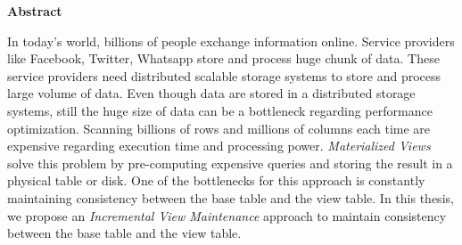 

\clearemptydoublepage
{}
{}	





\vspace*{2cm}
\begin{center}
{\Large \bf Abstract}
\end{center}
\vspace{1cm}



In today's world, billions of people exchange information online. Service providers like Facebook, Twitter, Whatsapp store and process huge chunk of data. These service providers need distributed scalable storage systems to store and process large volume of data. Even though data are stored in a distributed storage systems, still the huge size of data can be a bottleneck regarding performance optimization. Scanning billions of rows and millions of columns each time are expensive regarding execution time and processing power. \emph{Materialized Views} solve this problem by pre-computing expensive queries and storing the result in a physical table or disk. One of the bottlenecks for this approach is constantly maintaining consistency between the base table and the view table. In this thesis, we propose an \emph{Incremental View Maintenance} approach to maintain consistency between the base table and the view table.